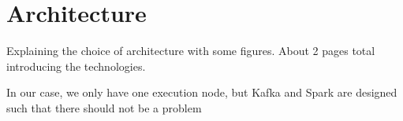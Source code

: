 \section{Architecture}
\label{sec:architecture}

Explaining the choice of architecture with some figures.
About 2 pages total introducing the technologies.


In our case, we only have one execution node, but Kafka and Spark are designed such that there should not be a problem
\pagebreak[2]